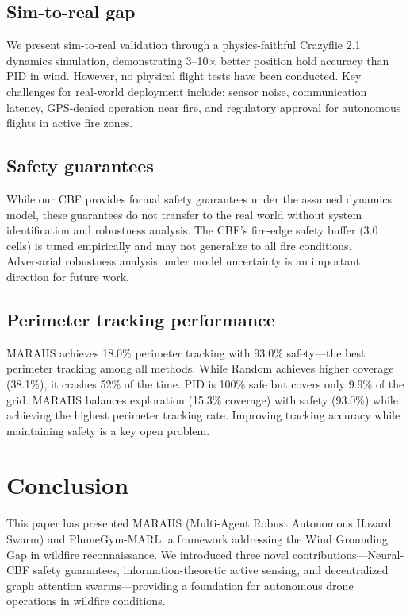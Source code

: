\documentclass[12pt,a4paper]{article}
\begin{document}
\subsection{Sim-to-real gap}
We present sim-to-real validation through a physics-faithful Crazyflie 2.1 dynamics simulation, demonstrating 3--10$\times$ better position hold accuracy than PID in wind. However, no physical flight tests have been conducted. Key challenges for real-world deployment include: sensor noise, communication latency, GPS-denied operation near fire, and regulatory approval for autonomous flights in active fire zones.

\subsection{Safety guarantees}
While our CBF provides formal safety guarantees under the assumed dynamics model, these guarantees do not transfer to the real world without system identification and robustness analysis. The CBF's fire-edge safety buffer (3.0 cells) is tuned empirically and may not generalize to all fire conditions. Adversarial robustness analysis under model uncertainty is an important direction for future work.

\subsection{Perimeter tracking performance}
MARAHS achieves 18.0\% perimeter tracking with 93.0\% safety---the best perimeter tracking among all methods. While Random achieves higher coverage (38.1\%), it crashes 52\% of the time. PID is 100\% safe but covers only 9.9\% of the grid. MARAHS balances exploration (15.3\% coverage) with safety (93.0\%) while achieving the highest perimeter tracking rate. Improving tracking accuracy while maintaining safety is a key open problem.

\section{Conclusion}
\label{sec:conclusion}

This paper has presented MARAHS (Multi-Agent Robust Autonomous Hazard Swarm) and PlumeGym-MARL, a framework addressing the Wind Grounding Gap in wildfire reconnaissance. We introduced three novel contributions---Neural-CBF safety guarantees, information-theoretic active sensing, and decentralized graph attention swarms---providing a foundation for autonomous drone operations in wildfire conditions.
\end{document}
